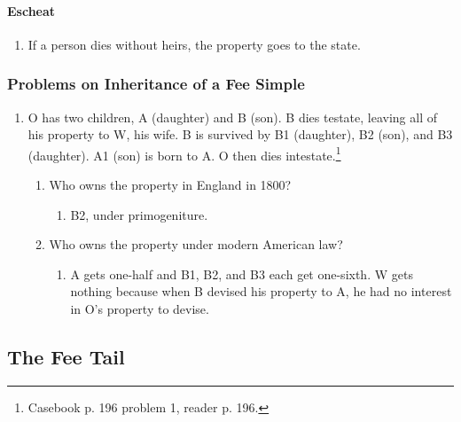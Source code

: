\paragraph{Escheat}

\begin{enumerate}
    \item If a person dies without heirs, the property goes to the state.
\end{enumerate}

\subsubsection{Problems on Inheritance of a Fee Simple}

\begin{enumerate}
    \item O has two children, A (daughter) and B (son). B dies testate, 
    leaving all of his property to W, his wife. B is survived by B1 
    (daughter), B2 (son), and B3 (daughter). A1 (son) is born to A. O then 
    dies intestate.\footnote{Casebook p. 196 problem 1, reader p. 196.}
    \begin{enumerate}
        \item Who owns the property in England in 1800?
        \begin{enumerate}
            \item B2, under primogeniture.
        \end{enumerate}
        \item Who owns the property under modern American law?
        \begin{enumerate}
            \item A gets one-half and B1, B2, and B3 each get one-sixth. W 
            gets nothing because when B devised his property to A, he had no
            interest in O's property to devise.
        \end{enumerate}
    \end{enumerate}
\end{enumerate}

\subsection{The Fee Tail}


